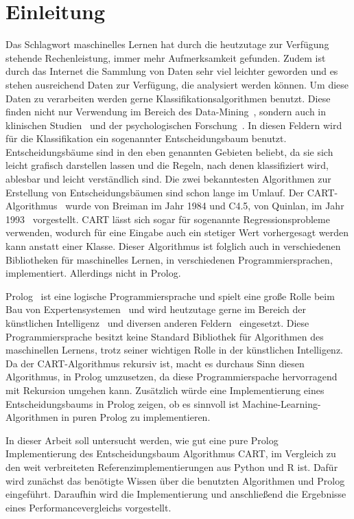 \section{Einleitung}

Das Schlagwort maschinelles Lernen hat durch die heutzutage zur Verfügung stehende Rechenleistung,
immer mehr Aufmerksamkeit gefunden. Zudem ist durch das Internet die Sammlung von Daten sehr viel leichter
geworden und es stehen ausreichend Daten zur Verfügung, die analysiert werden können.
Um diese Daten zu verarbeiten werden gerne Klassifikationsalgorithmen benutzt. Diese finden nicht nur
Verwendung im Bereich des Data-Mining~\cite{sharma2016survey}, sondern auch in klinischen Studien~\cite{lewis2000introduction}
und der psychologischen Forschung~\cite{Strobl2009-hw}.
In diesen Feldern wird für die Klassifikation ein sogenannter Entscheidungsbaum benutzt.
Entscheidungsbäume sind in den eben genannten Gebieten beliebt, da sie sich leicht grafisch darstellen lassen
und die Regeln, nach denen klassifiziert wird, ablesbar und leicht verständlich sind.
Die zwei bekanntesten Algorithmen zur Erstellung von Entscheidungsbäumen sind schon lange im Umlauf.
Der CART-Algorithmus~\cite{breiman1984classification} wurde von Breiman im Jahr 1984 und C4.5, von Quinlan, im Jahr 1993~\cite{quinlan1993c45}
vorgestellt. CART lässt sich sogar für sogenannte Regressionsprobleme verwenden, wodurch für eine Eingabe auch ein stetiger Wert
vorhergesagt werden kann anstatt einer Klasse. Dieser Algorithmus ist folglich auch in verschiedenen Bibliotheken für maschinelles Lernen,
in verschiedenen Programmiersprachen, implementiert. Allerdings nicht in Prolog.

Prolog~\cite{Colmerauer1993TheBO} ist eine logische Programmiersprache und spielt eine große Rolle beim Bau von Expertensystemen~\cite{merritt2012building}
und wird heutzutage gerne im Bereich der künstlichen Intelligenz~\cite{shoham2014artificial} und diversen anderen Feldern~\cite{806816,wicaksono2016relational} eingesetzt.
Diese Programmiersprache besitzt keine Standard Bibliothek für Algorithmen des maschinellen Lernens, trotz seiner wichtigen Rolle in der künstlichen Intelligenz.
Da der CART-Algorithmus rekursiv ist, macht es durchaus Sinn diesen Algorithmus, in Prolog umzusetzen, da diese Programmierspache
hervorragend mit Rekursion umgehen kann. Zusätzlich würde eine Implementierung eines Entscheidungsbaums in Prolog zeigen, ob es sinnvoll ist
Machine-Learning-Algorithmen in puren Prolog zu implementieren.

In dieser Arbeit soll untersucht werden, wie gut eine pure Prolog Implementierung des Entscheidungsbaum Algorithmus
CART, im Vergleich zu den weit verbreiteten Referenzimplementierungen aus Python und R ist.
Dafür wird zunächst das benötigte Wissen über die benutzten Algorithmen und Prolog eingeführt.
Daraufhin wird die Implementierung und anschließend die Ergebnisse eines Performancevergleichs vorgestellt.